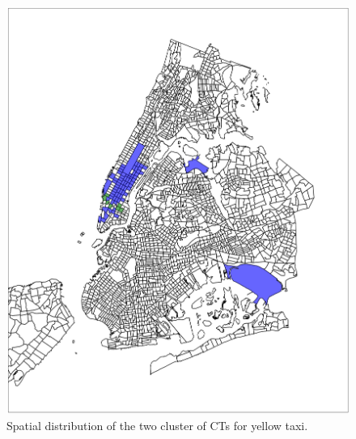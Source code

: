\documentclass[journal]{IEEEtran}
\begin{document}
\begin{figure}[!t] 
  \centering
  \includegraphics[width=1.0\columnwidth]{./figs/coloring_yellow.jpg}
  \caption{Spatial distribution of the two cluster of CTs for yellow taxi.}
  \label{fig:coloring_yellow}
\end{figure}
\end{document}
